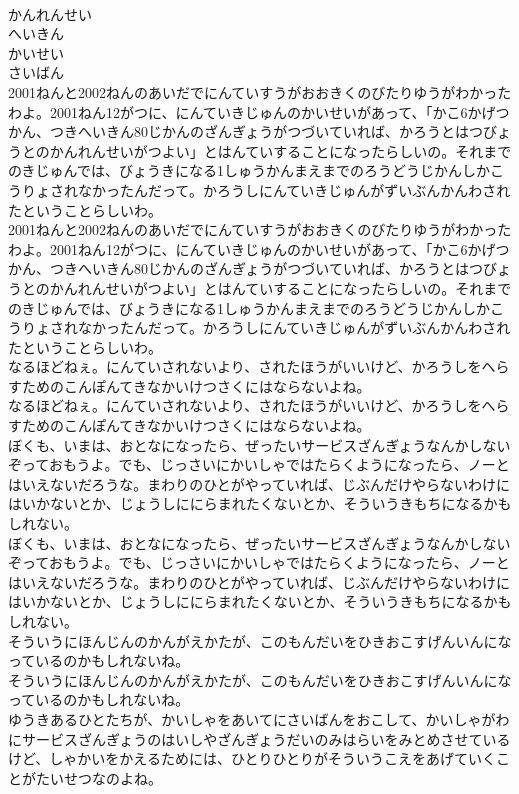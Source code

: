 \documentclass[8pt]{extreport}
\begin{document}
\begin{CJK}{UTF8}{min}
\\	かんれんせい
\\	へいきん
\\	かいせい
\\	さいばん
\\	2001ねんと2002ねんのあいだでにんていすうがおおきくのびたりゆうがわかったわよ。2001ねん12がつに、にんていきじゅんのかいせいがあって、「かこ6かげつかん、つきへいきん80じかんのざんぎょうがつづいていれば、かろうとはつびょうとのかんれんせいがつよい」とはんていすることになったらしいの。それまでのきじゅんでは、びょうきになる1しゅうかんまえまでのろうどうじかんしかこうりょされなかったんだって。かろうしにんていきじゅんがずいぶんかんわされたということらしいわ。
\\	2001ねんと2002ねんのあいだでにんていすうがおおきくのびたりゆうがわかったわよ。2001ねん12がつに、にんていきじゅんのかいせいがあって、「かこ6かげつかん、つきへいきん80じかんのざんぎょうがつづいていれば、かろうとはつびょうとのかんれんせいがつよい」とはんていすることになったらしいの。それまでのきじゅんでは、びょうきになる1しゅうかんまえまでのろうどうじかんしかこうりょされなかったんだって。かろうしにんていきじゅんがずいぶんかんわされたということらしいわ。
\\	なるほどねぇ。にんていされないより、されたほうがいいけど、かろうしをへらすためのこんぽんてきなかいけつさくにはならないよね。
\\	なるほどねぇ。にんていされないより、されたほうがいいけど、かろうしをへらすためのこんぽんてきなかいけつさくにはならないよね。
\\	ぼくも、いまは、おとなになったら、ぜったいサービスざんぎょうなんかしないぞっておもうよ。でも、じっさいにかいしゃではたらくようになったら、ノーとはいえないだろうな。まわりのひとがやっていれば、じぶんだけやらないわけにはいかないとか、じょうしににらまれたくないとか、そういうきもちになるかもしれない。
\\	ぼくも、いまは、おとなになったら、ぜったいサービスざんぎょうなんかしないぞっておもうよ。でも、じっさいにかいしゃではたらくようになったら、ノーとはいえないだろうな。まわりのひとがやっていれば、じぶんだけやらないわけにはいかないとか、じょうしににらまれたくないとか、そういうきもちになるかもしれない。
\\	そういうにほんじんのかんがえかたが、このもんだいをひきおこすげんいんになっているのかもしれないね。
\\	そういうにほんじんのかんがえかたが、このもんだいをひきおこすげんいんになっているのかもしれないね。
\\	ゆうきあるひとたちが、かいしゃをあいてにさいばんをおこして、かいしゃがわにサービスざんぎょうのはいしやざんぎょうだいのみはらいをみとめさせているけど、しゃかいをかえるためには、ひとりひとりがそういうこえをあげていくことがたいせつなのよね。

\end{CJK}
\end{document}
